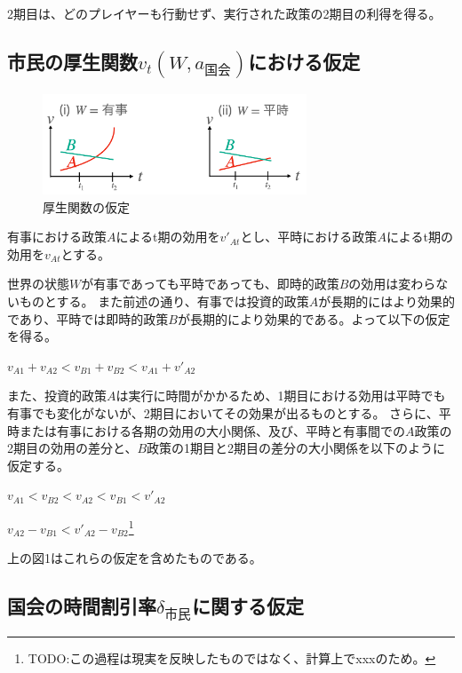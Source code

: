 \documentclass[main.tex]{subfiles}
\begin{document}
2期目は、どのプレイヤーも行動せず、実行された政策の2期目の利得を得る。




\subsection{市民の厚生関数$v_t(W, a_{国会})$における仮定}

\begin{figure}[htbp]
  \centering
  \includegraphics[width=0.7\textwidth]{./image/assumption_welfare_policy.png}
  \caption{厚生関数の仮定} 
  \label{fig:assumption_welfare_policy}
\end{figure}

有事における政策$A$によるt期の効用を$v'_{At}$とし、平時における政策$A$によるt期の効用を$v_{At}$とする。

世界の状態$W$が有事であっても平時であっても、即時的政策$B$の効用は変わらないものとする。
また前述の通り、有事では投資的政策$A$が長期的にはより効果的であり、平時では即時的政策$B$が長期的により効果的である。よって以下の仮定を得る。
\begin{assumption}  $v_{A1} + v_{A2}<v_{B1} + v_{B2} <  v_{A1} + v'_{A2}$ \end{assumption}


また、投資的政策$A$は実行に時間がかかるため、1期目における効用は平時でも有事でも変化がないが、2期目においてその効果が出るものとする。
さらに、平時または有事における各期の効用の大小関係、及び、平時と有事間での$A$政策の2期目の効用の差分と、$B$政策の1期目と2期目の差分の大小関係を以下のように仮定する。
\begin{assumption}  $v_{A1} < v_{B2} < v_{A2} < v_{B1} < v'_{A2}$  \end{assumption}
\begin{assumption}  $v_{A2} - v_{B1} < v'_{A2} - v_{B2}$\footnote{TODO:この過程は現実を反映したものではなく、計算上でxxxのため。}  \end{assumption}

上の図1はこれらの仮定を含めたものである。




\subsection{国会の時間割引率$\delta_{市民}$に関する仮定}
\end{document}
